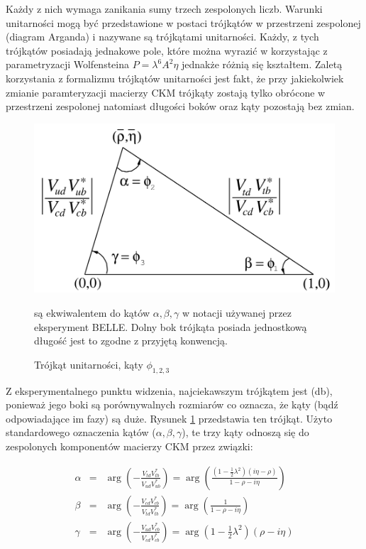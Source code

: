  Każdy z nich wymaga zanikania sumy trzech zespolonych liczb. Warunki unitarności mogą być przedstawione w postaci trójkątów w przestrzeni zespolonej (diagram Arganda) i nazywane są trójkątami unitarności. Każdy, z  tych trójkątów posiadają jednakowe pole, które można wyrazić w korzystając z parametryzacji Wolfensteina  $P=\lambda^6A^2 \eta$ jednakże różnią się kształtem. Zaletą korzystania z formalizmu trójkątów unitarności jest fakt, że przy jakiekolwiek zmianie paramteryzacji macierzy CKM trójkąty zostają tylko obrócone w przestrzeni zespolonej natomiast długości boków oraz kąty pozostają bez zmian. 
 
 \begin{figure}[ht]
 \centering
 \includegraphics[scale=0.3]{rozdzial1/trojkat.png}
 \caption{Trójkąt unitarności, kąty $ \phi_{1,2,3}$} są ekwiwalentem do kątów $\alpha,\beta,\gamma$ w notacji używanej przez eksperyment BELLE. Dolny bok trójkąta posiada jednostkową długość jest to zgodne z przyjętą konwencją. 
 \label{fig:trojkat db}
\end{figure}
 

Z eksperymentalnego punktu widzenia, najciekawszym trójkątem jest (db), ponieważ jego boki są porównywalnych rozmiarów co oznacza, że kąty (bądź odpowiadające im fazy) są duże. Rysunek \ref{fig:trojkat db} przedstawia ten trójkąt. Użyto standardowego oznaczenia kątów ($\alpha , \beta , \gamma $), te trzy kąty odnoszą się do zespolonych komponentów macierzy CKM przez związki:

\begin{eqnarray}
\alpha &=& \arg \left(- \frac{V_{td}V^*_{tb}}{ V_{ud}V_{ub}^* }  \right) =\arg \left( \frac{(1-\frac{1}{2} \lambda^2)(i \eta -\rho )}{1-\rho -i\eta}  \right)\\
\beta &=& \arg \left(- \frac{V_{cd}V^*_{cb}}{ V_{td}V_{tb}^* }  \right) =\arg \left( \frac{1}{1-\rho -i\eta}  \right)\\
\gamma &=& \arg \left(- \frac{V_{ud}V^*_{cb}}{ V_{cd}V_{cb}^* }  \right) =\arg \left( 1-\frac{1}{2} \lambda^2 \right) \left( \rho -i \eta \right)
\end{eqnarray} 


